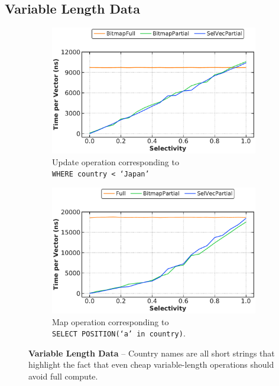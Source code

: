 \documentclass[12pt]{cmuthesis}
\begin{document}
\subsection{Variable Length Data}
\begin{figure}[t!]
\captionsetup[subfigure]{justification=justified}
\centering
\begin{subfigure}[t]{.49\linewidth}
 \centering
 \includegraphics[width=0.9\linewidth]{eval/simple_string_update.pdf}
 \caption{Update operation corresponding to \\ \texttt{\footnotesize WHERE country < `Japan'}}
  \label{fig:varlen_update}
\end{subfigure}
\begin{subfigure}[t]{.49\linewidth}
 \centering
 \includegraphics[width=0.9\linewidth]{eval/simple_string_map.pdf}
 \caption{Map operation corresponding to \\ \texttt{\footnotesize SELECT POSITION(`a' in country)}.}
  \label{fig:varlen_map}
\end{subfigure}
\caption{\textbf{Variable Length Data} -- Country names are all short strings that highlight the fact that even cheap variable-length operations should avoid full compute.}
\label{fig:varlen_map_update}
\end{figure}
\end{document}
